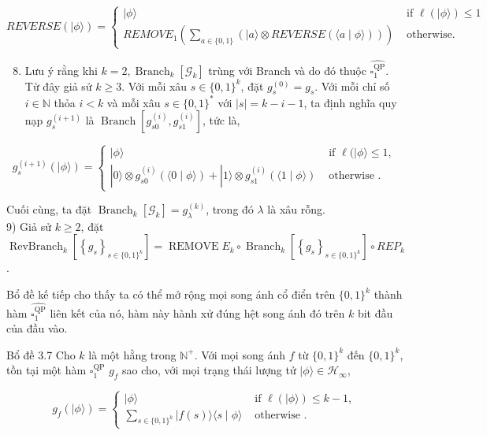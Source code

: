\documentclass[10pt]{article}
\begin{document}
$$
R E V E R S E(|\phi\rangle)= \begin{cases}|\phi\rangle & \text { if } \ell(|\phi\rangle) \leq 1 \\ R E M O V E_{1}\left(\sum_{a \in\{0,1\}}(|a\rangle \otimes R E V E R S E(\langle a \mid \phi\rangle))\right) & \text { otherwise. }\end{cases}
$$

\begin{enumerate}
  \setcounter{enumi}{7}
  \item Lưu ý rằng khi $k=2, \operatorname{Branch}_{k}\left[\mathcal{G}_{k}\right]$ trùng với Branch và do đó thuộc $\widehat{\square_{1}^{\mathrm{QP}}}$. Từ đây giả sử $k \geq 3$. Với mỗi xâu $s \in\{0,1\}^{k}$, đặt $g_{s}^{(0)}=g_{s}$. Với mỗi chỉ số $i \in \mathbb{N}$ thỏa $i<k$ và mỗi xâu $s \in\{0,1\}^{*}$ với $|s|=k-i-1$, ta định nghĩa quy nạp $g_{s}^{(i+1)}$ là $\operatorname{Branch}\left[g_{s 0}^{(i)}, g_{s 1}^{(i)}\right]$, tức là,
\end{enumerate}

$$
g_{s}^{(i+1)}(|\phi\rangle)= \begin{cases}|\phi\rangle & \text { if } \ell(|\phi\rangle \leq 1, \\ |0\rangle \otimes g_{s 0}^{(i)}(\langle 0 \mid \phi\rangle)+|1\rangle \otimes g_{s 1}^{(i)}(\langle 1 \mid \phi\rangle) & \text { otherwise } .\end{cases}
$$

Cuối cùng, ta đặt $\operatorname{Branch}_{k}\left[\mathcal{G}_{k}\right]=g_{\lambda}^{(k)}$, trong đó $\lambda$ là xâu rỗng.\\
9) Giả sử $k \geq 2$, đặt $\operatorname{RevBranch}_{k}\left[\left\{g_{s}\right\}_{s \in\{0,1\}^{k}}\right]=\operatorname{REMOVE} E_{k} \circ \operatorname{Branch}_{k}\left[\left\{g_{s}\right\}_{s \in\{0,1\}^{k}}\right] \circ R E P_{k}$.

Bổ đề kế tiếp cho thấy ta có thể mở rộng mọi song ánh cổ điển trên $\{0,1\}^{k}$ thành hàm $\widehat{\square_{1}^{\mathrm{QP}}}$ liên kết của nó, hàm này hành xử đúng hệt song ánh đó trên $k$ bit đầu của đầu vào.

Bổ đề 3.7 Cho $k$ là một hằng trong $\mathbb{N}^{+}$. Với mọi song ánh $f$ từ $\{0,1\}^{k}$ đến $\{0,1\}^{k}$, tồn tại một hàm $\square_{1}^{\mathrm{QP}}$ $g_{f}$ sao cho, với mọi trạng thái lượng tử $|\phi\rangle \in \mathcal{H}_{\infty}$,

$$
g_{f}(|\phi\rangle)= \begin{cases}|\phi\rangle & \text { if } \ell(|\phi\rangle) \leq k-1, \\ \sum_{s \in\{0,1\}^{k}}|f(s)\rangle\langle s \mid \phi\rangle & \text { otherwise } .\end{cases}
$$
\end{document}
